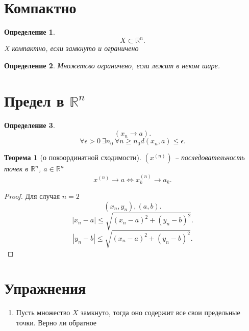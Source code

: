 \documentclass[14pt]{extarticle}
\newtheorem{theorem}{Теорема}
\newtheorem{definition}{Определение}
\begin{document}
\section{Компактно}
\begin{definition}
	\[
		X \subset \mathbb{R}^{n}
		.\]
	X компактно, если замкнуто и ограничено
\end{definition}
\begin{definition}
	Множетсво ограничено, если лежит в неком шаре.
\end{definition}
\section{Предел в $\mathbb{R}^{n}$}
\begin{definition}
    \[
        (x_{n} \to a)
    .\] 
    \[
    \forall  \epsilon > 0 ~ \exists  n_{0} ~  \forall  n \ge  n_0 d(x_{n},a) \le  \epsilon
    .\] 
\end{definition}
\begin{theorem}[о покоординатной сходимости]
    $(x^{(n)})$ -- последовательность точек в $\mathbb{R}^{n}$, $a \in \mathbb{R}^{n}$
     \[
     x^{(n)} \to a \iff x_{k}^{(n)} \to a_{k}
     .\] 
\end{theorem}
\begin{proof}
    Для случая $n = 2$
     \[
         (x_{n},y_{n}) , (a,b)
    .\] 
    \[
    |x_{n} - a| \le  \sqrt{(x_{n} - a)^2 + (y_{n} - b)^2}
    .\] 
    \[
    |y_{n} - b| \le  \sqrt{(x_{n} - a)^2 + (y_{n} - b)^2}
    .\] 
\end{proof}
\section{Упражнения}
\begin{enumerate}
    \item 
Пусть множество $X$ замкнуто, тогда оно содержит все свои предельные точки. Верно ли обратное
\end{enumerate}
\end{document}
